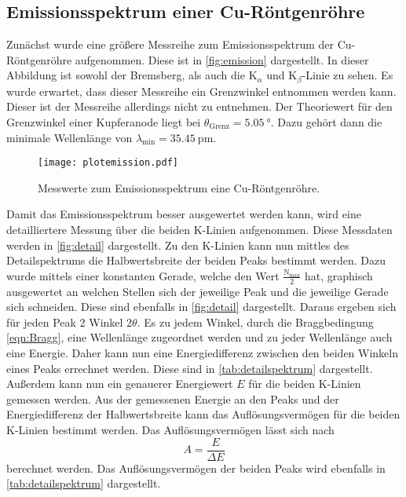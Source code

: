 \subsection{Emissionsspektrum einer Cu-Röntgenröhre}
\label{subsec:emission}
Zunächst wurde eine größere Messreihe zum Emissionsspektrum der Cu-Röntgenröhre aufgenommen. Diese ist in \autoref{fig:emission} dargestellt. In dieser Abbildung ist 
sowohl der Bremsberg, als auch die $\text{K}_{\alpha}$ und $\text{K}_{\beta}$-Linie zu sehen. Es wurde erwartet, dass dieser Messreihe ein Grenzwinkel entnommen werden kann. Dieser ist 
der Messreihe allerdings nicht zu entnehmen. Der Theoriewert für den Grenzwinkel einer Kupferanode liegt bei $\theta_{\text{Grenz}} = \qty{5.05}{\degree}$.
Dazu gehört dann die minimale Wellenlänge von $\lambda_{\text{min}} = \qty{35.45}{\pico\metre}$. 
\begin{figure}
    \centering
    \texttt{[image: plotemission.pdf]}
    \caption{Messwerte zum Emissionsspektrum eine Cu-Röntgenröhre.}
    \label{fig:emission}
\end{figure}
Damit das Emissionsspektrum besser ausgewertet werden kann, wird eine detailliertere Messung über die beiden K-Linien aufgenommen. Diese Messdaten werden in \autoref{fig:detail}
dargestellt. Zu den K-Linien kann nun mittles des Detailspektrums die Halbwertsbreite der beiden Peaks bestimmt werden. Dazu wurde mittels einer konstanten Gerade, welche
den Wert $\frac{\text{N}_{\text{max}}}{2}$ hat, graphisch ausgewertet an welchen Stellen sich der jeweilige Peak und die jeweilige Gerade sich schneiden. Diese sind 
ebenfalls in \autoref{fig:detail} dargestellt. Daraus ergeben sich für jeden Peak 2 Winkel $2\theta$. Es zu jedem Winkel, durch die Braggbedingung \eqref{eqn:Bragg},
eine Wellenlänge zugeordnet werden und zu jeder Wellenlänge auch eine Energie. Daher kann nun eine Energiedifferenz zwischen den beiden Winkeln eines Peaks errechnet werden.
Diese sind in \autoref{tab:detailspektrum} dargestellt. Außerdem kann nun ein genauerer Energiewert $E$ für die beiden K-Linien gemessen werden. 
Aus der gemessenen Energie an den Peaks und der Energiedifferenz der Halbwertsbreite kann das Auflösungsvermögen für die beiden K-Linien bestimmt werden.
Das Auflösungsvermögen lässt sich nach 
\begin{equation*}
    A = \frac{E}{\Delta E}
\end{equation*}
berechnet werden. Das Auflösungsvermögen der beiden Peaks wird ebenfalls in \autoref{tab:detailspektrum} dargestellt.
